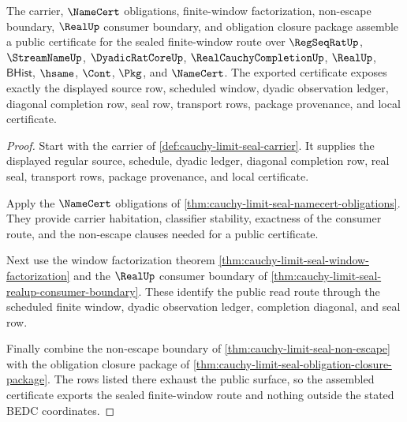 \begin{theorem}
\label{thm:cauchy-limit-seal-public-export-certificate}
The carrier, $\NameCert$ obligations, finite-window factorization, non-escape boundary, $\RealUp$ consumer boundary, and obligation closure package assemble a public certificate for the sealed finite-window route over $\RegSeqRatUp$, $\StreamNameUp$, $\DyadicRatCoreUp$, $\RealCauchyCompletionUp$, $\RealUp$, $\mathsf{BHist}$, $\hsame$, $\Cont$, $\Pkg$, and $\NameCert$. The exported certificate exposes exactly the displayed source row, scheduled window, dyadic observation ledger, diagonal completion row, seal row, transport rows, package provenance, and local certificate.
\end{theorem}
\begin{proof}
Start with the carrier of \autoref{def:cauchy-limit-seal-carrier}. It supplies the displayed regular source, schedule, dyadic ledger, diagonal completion row, real seal, transport rows, package provenance, and local certificate.

Apply the $\NameCert$ obligations of \autoref{thm:cauchy-limit-seal-namecert-obligations}. They provide carrier habitation, classifier stability, exactness of the consumer route, and the non-escape clauses needed for a public certificate.

Next use the window factorization theorem \autoref{thm:cauchy-limit-seal-window-factorization} and the $\RealUp$ consumer boundary of \autoref{thm:cauchy-limit-seal-realup-consumer-boundary}. These identify the public read route through the scheduled finite window, dyadic observation ledger, completion diagonal, and seal row.

Finally combine the non-escape boundary of \autoref{thm:cauchy-limit-seal-non-escape} with the obligation closure package of \autoref{thm:cauchy-limit-seal-obligation-closure-package}. The rows listed there exhaust the public surface, so the assembled certificate exports the sealed finite-window route and nothing outside the stated BEDC coordinates.
\end{proof}


